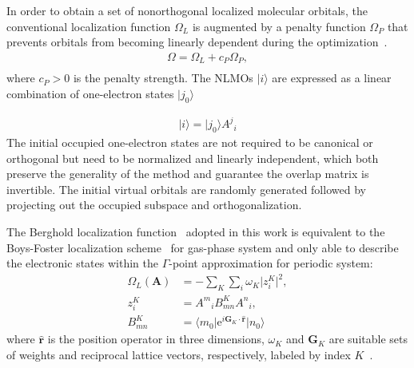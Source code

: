 \documentclass[aps,prl,reprint,amsmath,amssymb]{revtex4-1}
\newcommand*{\imi}{i} %
\newcommand*{\E}{\mathrm{e}}
\newcommand{\ket}[1]{\ensuremath{\vert #1 \rangle}}
\newcommand{\bra}[1]{\ensuremath{\langle #1 \vert}}
\newcommand{\op}[1]{\ensuremath{\hat{#1}}} %
\begin{document}
In order to obtain a set of nonorthogonal localized molecular orbitals, the conventional localization function $\Omega_L$ is augmented by a penalty function  $\Omega_P$ that prevents orbitals from becoming linearly dependent during the optimization~\cite{luo2020direct}.
%
\begin{equation} \label{eq:fun-overall}
\begin{split}
\Omega = \Omega_L + c_P \Omega_P, \\
\end{split}
\end{equation}
%
where $c_P > 0$ is the penalty strength. 
The NLMOs $\ket{i}$ are expressed as a linear combination of one-electron states $\ket{j_0}$

%
\begin{equation}
\begin{split}
\ket{i} = \ket{j_0} {A^j}_i 
\end{split}
\end{equation}
%
The initial occupied one-electron states are not required to be canonical or orthogonal but need to be normalized and linearly independent, which both preserve the generality of the method and guarantee the overlap matrix is invertible. The initial virtual orbitals are randomly generated followed by projecting out the occupied subspace and orthogonalization.

The Berghold localization function~\cite{resta1998quantum, resta1999electron, berghold2000general}  adopted in this work is equivalent to the Boys-Foster localization scheme~\cite{berghold2000general, resta1999electron} for gas-phase system and only able to describe the electronic states within the  $\Gamma$-point approximation for periodic system:
%
\begin{equation} \label{eq:fun-loc}
\begin{split}
\Omega_L(\mathbf{A}) &= - \sum_K \sum_i \omega_K \vert z_{i}^{K} \vert^2, \\
z_{i}^{K} &= {A^m}_i B^{K}_{mn} {A^n}_i, \\
B^{K}_{mn} &= \bra{m_0} \E^{\imi \mathbf{G}_K \cdot \mathbf{\op{r}}} \ket{n_0}
\end{split}
\end{equation}
%
where $\mathbf{\op{r}}$ is the position operator in three dimensions, $\omega_K$ and $\mathbf{G}_K$ are suitable sets of weights and reciprocal lattice vectors, respectively, labeled by index $K$~\cite{silvestrelli1999maximally, berghold2000general}. 
\end{document}
